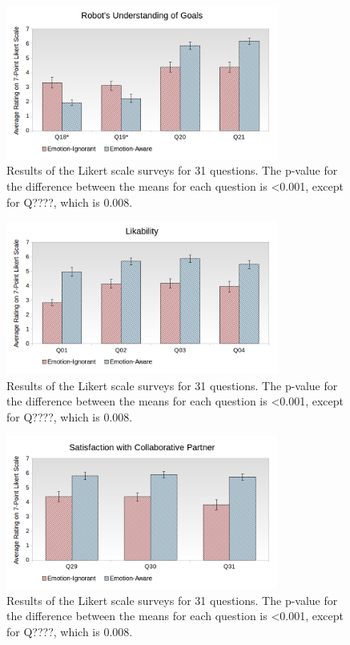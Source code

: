 \documentclass[12pt]{report}
\begin{document}
\begin{figure}
\centering
\includegraphics[width=0.8\textwidth]{figure/Overall-Goals.png}
\caption{Results of the Likert scale surveys for 31 questions. The p-value for
the difference between the means for each question is <0.001, except for Q????,
which is 0.008.}
\label{fig:overall-goals}
\end{figure}

\begin{figure}
\centering
\includegraphics[width=0.8\textwidth]{figure/Overall-Likability.png}
\caption{Results of the Likert scale surveys for 31 questions. The p-value for
the difference between the means for each question is <0.001, except for Q????,
which is 0.008.}
\label{fig:overall-likability}
\end{figure}

\begin{figure}
\centering
\includegraphics[width=0.8\textwidth]{figure/Overall-Satisfaction.png}
\caption{Results of the Likert scale surveys for 31 questions. The p-value for
the difference between the means for each question is <0.001, except for Q????,
which is 0.008.}
\label{fig:overall-satisfaction}
\end{figure}
\end{document}
